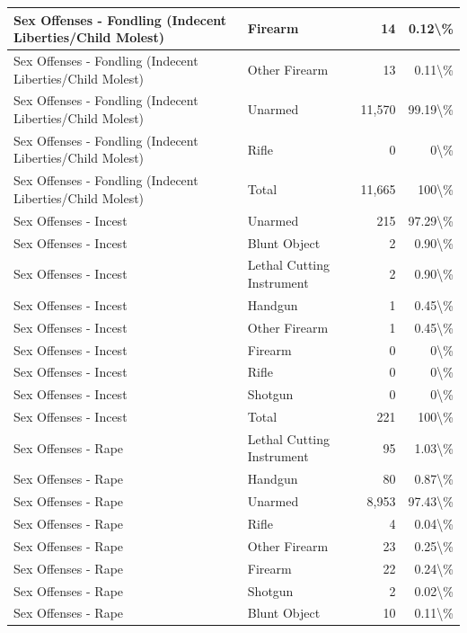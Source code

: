 \documentclass[
]{krantz}
\begin{document}
\begin{longtable}[t]{l|l|r|r}
\hline
Sex Offenses - Fondling (Indecent Liberties/Child Molest) & Firearm & 14 & 0.12\textbackslash{}\%\\
\hline
Sex Offenses - Fondling (Indecent Liberties/Child Molest) & Other Firearm & 13 & 0.11\textbackslash{}\%\\
\hline
Sex Offenses - Fondling (Indecent Liberties/Child Molest) & Unarmed & 11,570 & 99.19\textbackslash{}\%\\
\hline
Sex Offenses - Fondling (Indecent Liberties/Child Molest) & Rifle & 0 & 0\textbackslash{}\%\\
\hline
Sex Offenses - Fondling (Indecent Liberties/Child Molest) & Total & 11,665 & 100\textbackslash{}\%\\
\hline
Sex Offenses - Incest & Unarmed & 215 & 97.29\textbackslash{}\%\\
\hline
Sex Offenses - Incest & Blunt Object & 2 & 0.90\textbackslash{}\%\\
\hline
Sex Offenses - Incest & Lethal Cutting Instrument & 2 & 0.90\textbackslash{}\%\\
\hline
Sex Offenses - Incest & Handgun & 1 & 0.45\textbackslash{}\%\\
\hline
Sex Offenses - Incest & Other Firearm & 1 & 0.45\textbackslash{}\%\\
\hline
Sex Offenses - Incest & Firearm & 0 & 0\textbackslash{}\%\\
\hline
Sex Offenses - Incest & Rifle & 0 & 0\textbackslash{}\%\\
\hline
Sex Offenses - Incest & Shotgun & 0 & 0\textbackslash{}\%\\
\hline
Sex Offenses - Incest & Total & 221 & 100\textbackslash{}\%\\
\hline
Sex Offenses - Rape & Lethal Cutting Instrument & 95 & 1.03\textbackslash{}\%\\
\hline
Sex Offenses - Rape & Handgun & 80 & 0.87\textbackslash{}\%\\
\hline
Sex Offenses - Rape & Unarmed & 8,953 & 97.43\textbackslash{}\%\\
\hline
Sex Offenses - Rape & Rifle & 4 & 0.04\textbackslash{}\%\\
\hline
Sex Offenses - Rape & Other Firearm & 23 & 0.25\textbackslash{}\%\\
\hline
Sex Offenses - Rape & Firearm & 22 & 0.24\textbackslash{}\%\\
\hline
Sex Offenses - Rape & Shotgun & 2 & 0.02\textbackslash{}\%\\
\hline
Sex Offenses - Rape & Blunt Object & 10 & 0.11\textbackslash{}\%\\

\end{longtable}
\end{document}
